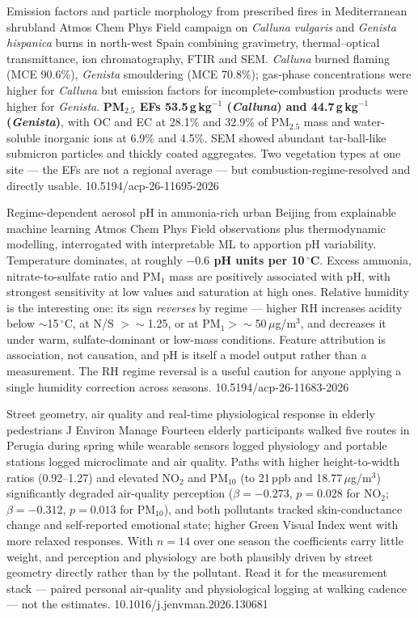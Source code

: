 \documentclass[10pt]{article}
\begin{document}
{Emission factors and particle morphology from prescribed fires in Mediterranean shrubland}
{Atmos Chem Phys}
{Field campaign on \textit{Calluna vulgaris} and \textit{Genista hispanica} burns in
north-west Spain combining gravimetry, thermal--optical transmittance, ion chromatography,
FTIR and SEM. \textit{Calluna} burned flaming (MCE 90.6\%), \textit{Genista} smouldering
(MCE 70.8\%); gas-phase concentrations were higher for \textit{Calluna} but emission factors
for incomplete-combustion products were higher for \textit{Genista}.
\textbf{PM$_{2.5}$ EFs 53.5\,g\,kg$^{-1}$ (\textit{Calluna}) and 44.7\,g\,kg$^{-1}$
(\textit{Genista})}, with OC and EC at 28.1\% and 32.9\% of PM$_{2.5}$ mass and water-soluble
inorganic ions at 6.9\% and 4.5\%. SEM showed abundant tar-ball-like submicron particles and
thickly coated aggregates. Two vegetation types at one site --- the EFs are not a regional
average --- but combustion-regime-resolved and directly usable.}
{10.5194/acp-26-11695-2026}

{Regime-dependent aerosol pH in ammonia-rich urban Beijing from explainable machine learning}
{Atmos Chem Phys}
{Field observations plus thermodynamic modelling, interrogated with interpretable ML to
apportion pH variability. Temperature dominates, at roughly \textbf{$-0.6$ pH units per
10\,$^\circ$C}. Excess ammonia, nitrate-to-sulfate ratio and PM$_1$ mass are positively
associated with pH, with strongest sensitivity at low values and saturation at high ones.
Relative humidity is the interesting one: its sign \emph{reverses} by regime --- higher RH
increases acidity below $\sim$15\,$^\circ$C, at N/S $>\sim$1.25, or at PM$_1>\sim$50\,$\mu$g/m$^3$,
and decreases it under warm, sulfate-dominant or low-mass conditions. Feature attribution is
association, not causation, and pH is itself a model output rather than a measurement. The
RH regime reversal is a useful caution for anyone applying a single humidity correction
across seasons.}
{10.5194/acp-26-11683-2026}

{Street geometry, air quality and real-time physiological response in elderly pedestrians}
{J Environ Manage}
{Fourteen elderly participants walked five routes in Perugia during spring while wearable
sensors logged physiology and portable stations logged microclimate and air quality. Paths
with higher height-to-width ratios (0.92--1.27) and elevated NO$_2$ and PM$_{10}$ (to 21\,ppb
and 18.77\,$\mu$g/m$^3$) significantly degraded air-quality perception
($\beta=-0.273$, $p=0.028$ for NO$_2$; $\beta=-0.312$, $p=0.013$ for PM$_{10}$), and both
pollutants tracked skin-conductance change and self-reported emotional state; higher Green
Visual Index went with more relaxed responses. With $n=14$ over one season the coefficients
carry little weight, and perception and physiology are both plausibly driven by street
geometry directly rather than by the pollutant. Read it for the measurement stack --- paired
personal air-quality and physiological logging at walking cadence --- not the estimates.}
{10.1016/j.jenvman.2026.130681}
\end{document}
